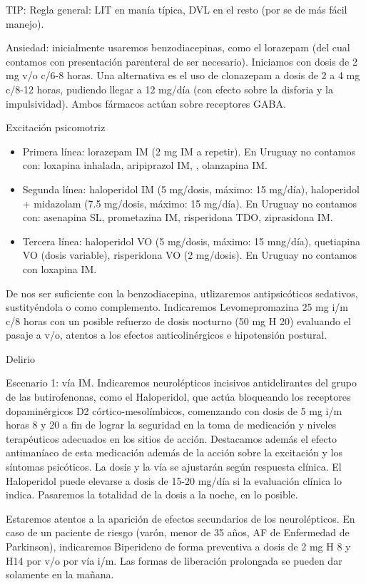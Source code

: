 TIP: Regla general: LIT en manía típica, DVL en el resto (por se de más fácil manejo).

\faMedkit Ansiedad: inicialmente usaremos benzodiacepinas, como el lorazepam (del cual contamos con presentación parenteral de ser necesario). Iniciamos con dosis de 2 mg v/o c/6-8 horas. Una alternativa es el uso de clonazepam a dosis de 2 a 4 mg c/8-12 horas, pudiendo llegar a 12 mg/día (con efecto sobre la disforia y la impulsividad). Ambos fármacos actúan sobre receptores GABA.

\faMedkit Excitación psicomotriz
\begin{itemize}
	\item Primera línea: lorazepam IM (2 mg IM a repetir). En Uruguay no contamos con: loxapina inhalada, aripiprazol IM, , olanzapina IM.
	\item Segunda línea: haloperidol IM (5 mg/dosis, máximo: 15 mg/día), haloperidol + midazolam  (7.5 mg/dosis, máximo: 15 mg/día). En Uruguay no contamos con: asenapina SL, prometazina IM, risperidona TDO, ziprasidona IM.
	\item Tercera línea: haloperidol VO (5 mg/dosis, máximo: 15 mng/día), quetiapina VO (dosis variable), risperidona VO (2 mg/dosis). En Uruguay no contamos con loxapina IM.
\end{itemize}
De nos ser suficiente con la benzodiacepina, utlizaremos antipsicóticos sedativos, sustityéndola o como complemento. Indicaremos Levomepromazina 25 mg i/m c/8 horas con un posible refuerzo de dosis nocturno (50 mg H 20) evaluando el pasaje a v/o, atentos a los efectos anticolinérgicos e hipotensión postural.

\faMedkit Delirio

Escenario 1: vía IM.
Indicaremos neurolépticos incisivos antidelirantes del grupo de las butirofenonas, como el Haloperidol, que actúa bloqueando los receptores dopaminérgicos D2 córtico-mesolímbicos, comenzando con dosis de 5 mg i/m horas 8 y 20 a fin de lograr la seguridad en la toma de medicación y niveles terapéuticos adecuados en los sitios de acción. Destacamos además el efecto antimaníaco de esta medicación además de la acción sobre la excitación y los síntomas psicóticos. La dosis y la vía se ajustarán según respuesta clínica. El Haloperidol puede elevarse a dosis de 15-20 mg/día si la evaluación clínica lo indica. Pasaremos la totalidad de la dosis a la noche, en lo posible.

Estaremos atentos a la aparición de efectos secundarios de los neurolépticos. En caso de un paciente de riesgo (varón, menor de 35 años, AF de Enfermedad de Parkinson), indicaremos Biperideno de forma preventiva a dosis de 2 mg H 8 y H14 por v/o por vía i/m. Las formas de liberación prolongada se pueden dar solamente en la mañana.

